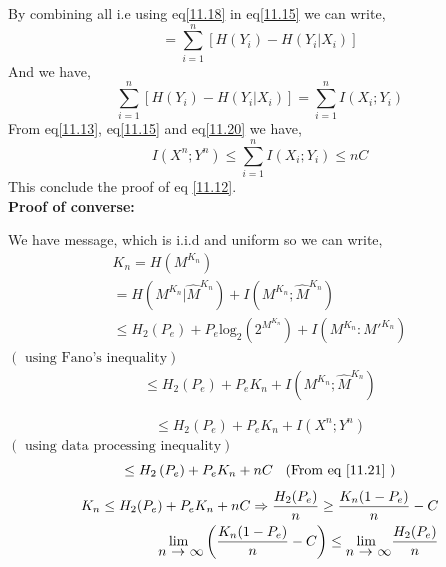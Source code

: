 \documentclass{article}
\begin{document}
  By combining all i.e using eq\eqref{11.18} in eq\ref{11.15} we can write,
  \begin{equation}
  = \sum_{i=1}^{n} \left[ H\left( Y_i\right) - H \left( Y_i| X_i \right) \right]
  \end{equation}
 And we have,
 \begin{equation}
 	 \sum_{i=1}^{n} \left[ H\left( Y_i\right) - H\left( Y_i |X_i \right) \right] = \sum_{i=1}^{n} I \left( {X_i ; Y_i} \right) \label{11.20}
 \end{equation}
From  eq\eqref{11.13}, eq\eqref{11.15} and eq\eqref{11.20} we have,
\begin{equation}
	I \left( X^n ; Y^n\right) \leq \sum_{i=1}^{n} I \left( {X_i ; Y_i} \right) \leq nC \label{11.21}
\end{equation}
This conclude the proof of eq \eqref{11.12}. \\

\textbf{Proof of converse:}


We have message, which is i.i.d and uniform so we can write,
\begin{gather}
	K_n = H \left( M^{K_n}\right)\\
	= H\left( M^{K_n}|\hat{M}^{K_n}\right) + I\left( M^{K_n} ; \hat{M}^{K_n}\right)\\
   \leq H_{2}(P_{e}) + P_{e}\text{log}_{2}(2^{M^{K_{n}}}) + I(M^{K_{n}}:{M'}^{K_{n}})
\end{gather}
\hspace{10cm} $\left(\text{ using Fano's inequality} \right)$
\begin{gather}
	\leq H_{2}\left( P_e\right) + P_{e}K_{n} + I\left( M^{K_n} ; \hat{M}^{K_n}\right)
\end{gather}

\begin{equation}
	\leq H_{2}\left( P_e\right) + P_{e}K_{n} + I\left( X^n ; Y^n\right)
\end{equation}
\hspace{10cm} $\left(\text{ using data processing inequality} \right)$
\begin{equation}
	\leq H_{2}\left( P_e\right) + P_{e}K_{n} + nC  \hspace{2mm}\text{ (From eq \ref{11.21} )}
\end{equation}
\begin{eqnarray*}
	  	K_{n}  \leq H_{2}(P_{e}) + P_{e}K_{n} + nC  \Rightarrow \frac{H_{2}(P_{e})}{n} \geq \frac{K_{n}(1 - P_{e})}{n} - C \\
	 	\stackunder{$\lim$ }{$n$ $\rightarrow$ $\infty$} \left(  \frac{K_{n}(1 - P_{e})}{n} - C \right) \leq  \stackunder{$\lim$ }{$n$ $\rightarrow$ $\infty$} \frac{H_{2}(P_{e})}{n}  
	 \end{eqnarray*} 
\end{document}
